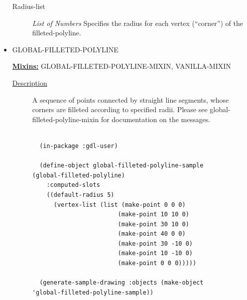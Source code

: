 \documentclass [11pt]{book}
\begin{document}
\begin{itemize}
\begin{description}
\item [Radius-list]
\emph{List of Numbers} Specifies the radius for each vertex (``corner'') of the filleted-polyline.


\end{description}







\item {}GLOBAL-FILLETED-POLYLINE


\textbf{
\underline{Mixins:}} GLOBAL-FILLETED-POLYLINE-MIXIN, VANILLA-MIXIN





\begin{description}

\item [
\underline{Description}]


A sequence of points connected by straight line segments, whose
corners are filleted according to specified radii. Please see global-filleted-polyline-mixin
for documentation on the messages.



\end{description}




\begin{figure}
\begin{lrbox}{\boxedverb}
\begin{minipage}{\linewidth}
{\small

\begin{verbatim}

  (in-package :gdl-user)

  (define-object global-filleted-polyline-sample (global-filleted-polyline)
    :computed-slots
    ((default-radius 5)
      (vertex-list (list (make-point 0 0 0)
                        (make-point 10 10 0)
                        (make-point 30 10 0)
                        (make-point 40 0 0)
                        (make-point 30 -10 0)
                        (make-point 10 -10 0)
                        (make-point 0 0 0)))))

  (generate-sample-drawing :objects (make-object 'global-filleted-polyline-sample))

  
\end{verbatim}}
\end{minipage}
\end{lrbox}
\fbox{\usebox{\boxedverb}}


\end{figure}
\end{itemize}
\end{document}
